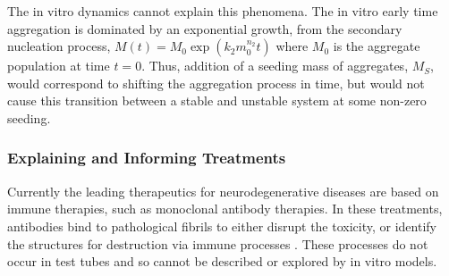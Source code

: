 The in vitro dynamics cannot explain this phenomena. The in vitro early time aggregation is dominated by an exponential growth, from the secondary nucleation process, $M(t) = M_0\exp(k_2 m_0^{n_2}t)$ where $M_0$ is the aggregate population at time $t=0$. Thus, addition of a seeding mass of aggregates, $M_S$, would correspond to shifting the aggregation process in time, but would not cause this transition between a stable and unstable system at some non-zero seeding.




\subsubsection{Explaining and Informing Treatments}

Currently the leading therapeutics for neurodegenerative diseases are based on immune therapies, such as monoclonal antibody therapies. In these treatments, antibodies bind to pathological fibrils to either disrupt the toxicity, or identify the structures for destruction via immune processes \cite{wisniewski_immunotherapeutic_2015, berg_biochemistry_2002}.  These processes do not occur in test tubes and so cannot be described or explored by in vitro models.

